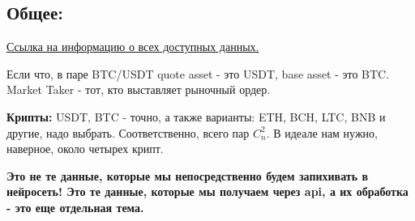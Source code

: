 \documentclass[a4paper,12pt]{article}
\begin{document}
\subsection*{Общее:}
	
\href{https://github.com/binance-exchange/binance-official-api-docs/blob/master/web-socket-streams.md}{Ссылка на информацию о всех доступных данных.}

Если что, в паре BTC/USDT quote asset - это USDT, base asset - это BTC. Market Taker - тот, кто выставляет рыночный ордер.

\textbf{Крипты:} USDT, BTC - точно, а также варианты: ETH, BCH, LTC, BNB и другие, надо выбрать. Соответственно, всего пар $C_n^2$. В идеале нам нужно, наверное, около четырех крипт.

\textbf{Это не те данные, которые мы непосредственно будем запихивать в нейросеть! Это те данные, которые мы получаем через api, а их обработка - это еще отдельная тема.}
\end{document}
